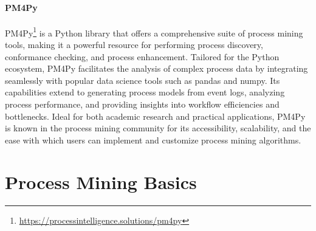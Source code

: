 \paragraph*{PM4Py}
PM4Py\footnote{\url{https://processintelligence.solutions/pm4py}} is a Python library that offers a comprehensive suite of process mining tools, making it a powerful resource for performing process discovery, conformance checking, and process enhancement. Tailored for the Python ecosystem, PM4Py facilitates the analysis of complex process data by integrating seamlessly with popular data science tools such as pandas and numpy. Its capabilities extend to generating process models from event logs, analyzing process performance, and providing insights into workflow efficiencies and bottlenecks. Ideal for both academic research and practical applications, PM4Py is known in the process mining community for its accessibility, scalability, and the ease with which users can implement and customize process mining algorithms.

\section{Process Mining Basics}

